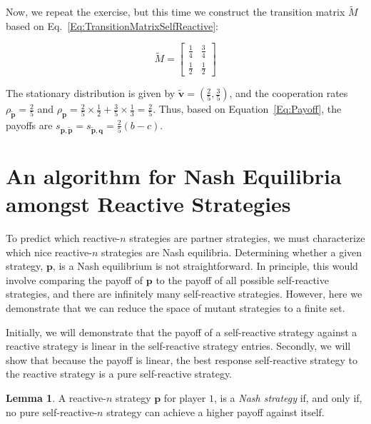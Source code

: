 \documentclass[11pt]{article}
\theoremstyle{definition}
\newtheorem{lemma}[theorem]{Lemma}
\begin{document}
Now, we repeat the exercise, but this time we construct the transition matrix
$\tilde{M}$ based on Eq.~\eqref{Eq:TransitionMatrixSelfReactive}:

$$
\tilde{M} = 
\begin{bmatrix}
  \frac{1}{4} & \frac{3}{4}\\[6pt]
  \frac{1}{2} & \frac{1}{2}
\end{bmatrix}
$$

The stationary distribution is given by $\mathbf{\tilde{v}} = \left(\frac{2}{5},
\frac{3}{5}\right)$, and the cooperation rates $\rho_\mathbf{\tilde{p}} =
\frac{2}{5}$ and $\rho_\mathbf{p} = \frac{2}{5} \times \frac{1}{2} + \frac{3}{5}
\times \frac{1}{3} = \frac{2}{5}$. Thus, based on Equation~\eqref{Eq:Payoff},
the payoffs are $s_{\mathbf{p}, \mathbf{\tilde{p}}} = s_{\mathbf{\tilde{p}},
\mathbf{q}} = \frac{2}{5}(b - c)$.


\section{An algorithm for Nash Equilibria amongst Reactive Strategies}\label{section:algorithm_for_nash}

To predict which reactive-$n$ strategies are partner strategies, we must
characterize which nice reactive-$n$ strategies are Nash equilibria. Determining
whether a given strategy, $\mathbf{p}$, is a Nash equilibrium is not
straightforward. In principle, this would involve comparing the payoff of
$\mathbf{p}$ to the payoff of all possible self-reactive strategies, and there
are infinitely many self-reactive strategies. However, here we demonstrate that
we can reduce the space of mutant strategies to a finite set.

Initially, we will demonstrate that the payoff of a self-reactive strategy
against a reactive strategy is linear in the self-reactive strategy entries.
Secondly, we will show that because the payoff is linear, the best response
self-reactive strategy to the reactive strategy is a pure self-reactive
strategy.

\begin{lemma}\label{lemma:nash_against_pure_self_reactive} 
A reactive-$n$ strategy $\mathbf{p}$ for player $1$, is a \textit{Nash strategy}
if, and only if, no pure self-reactive-$n$ strategy can achieve a higher payoff
against itself.
\end{lemma}
\end{document}
